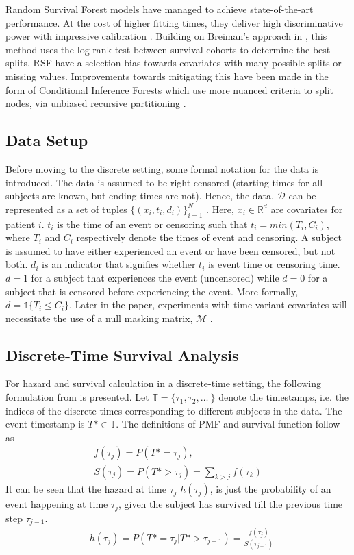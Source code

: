 \documentclass[%
 reprint,
 amsmath,amssymb,
 aps,nofootinbib
]{revtex4-2}
\begin{document}
Random Survival Forest models have managed to achieve state-of-the-art performance. At the cost of higher fitting times, they deliver high discriminative power with impressive calibration \cite{rsf}. Building on Breiman's approach in \cite{rf}, this method uses the log-rank test between survival cohorts to determine the best splits. RSF have a selection bias towards covariates with many possible splits or missing values. Improvements towards mitigating this have been made in the form of Conditional Inference Forests which use more nuanced criteria to split nodes, via unbiased recursive partitioning \cite{cit}.

\subsection{\label{setting}Data Setup}
Before moving to the discrete setting, some formal notation for the data is introduced. The data is assumed to be right-censored (starting times for all subjects are known, but ending times are not). Hence, the data, $\mathcal{D}$ can be represented as a set of tuples $\{(x_i , t_i , d_i)\}_{i=1}^{N}$  \cite{nagpal_deep_2021}. Here, $x_i \in \mathbb{R}^d$ are covariates for patient $i$. $t_i$ is the time of an event or censoring such that $t_i = min(T_i, C_i)$, where $T_i$ and $C_i$ respectively denote the times of event and censoring. A subject is assumed to have either experienced an event or have been censored, but not both. $d_i$ is an indicator that signifies whether $t_i$ is event time or censoring time. $d=1$ for a subject that experiences the event (uncensored) while $d=0$ for a subject that is censored before experiencing the event. More formally, $d= \mathds{1}\{T_i \le C_i\}$. Later in the paper, experiments with time-variant covariates will necessitate the use of a null masking matrix, $\mathcal{M}$ \cite{deephit}.\\

\subsection{\label{discrete}Discrete-Time Survival Analysis}
For hazard and survival calculation in a discrete-time setting, the following formulation from \cite{kvamme_continuous_2019} is presented. Let $\mathbb{T} = \{\tau_1, \tau_2, \ldots\ \}$ denote the timestamps, i.e. the indices of the discrete times corresponding to different subjects in the data. The event timestamp is $T*\in\mathbb{T}$. The definitions of PMF and survival function follow as
\begin{gather*}
f(\tau_j) = P(T* = \tau_j),\\
S(\tau_j) = P(T* >\tau_j) = \sum_{k>j}f(\tau_k)
\end{gather*}
It can be seen that the hazard at time $\tau_j$ $h(\tau_j)$, is just the probability of an event happening at time $\tau_j$, given the subject has survived till the previous time step $\tau_{j-1}$. 
\begin{align}
&h(\tau_j) = P(T* = \tau_j | T* > \tau_{j-1}) = \frac{f(\tau_j)}{S(\tau_{j-1})} \label{eq:haz_cond_proba}
\end{align}
\end{document}
